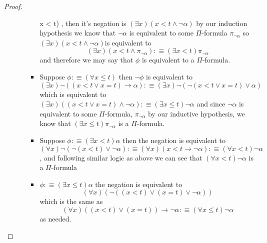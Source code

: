 \begin{proof}
\begin{itemize}
\begin{itemize}
\begin{itemize}
                \forall x < t\right) \alpha \), then it's negation is \(\left(
                \exists x\right) \left(x < t \land \neg \alpha\right) \) by
                our induction hypothesis we know that \(\neg \alpha \) is
                equivalent to some \(\Pi \)-formula \(\pi _{\neg \alpha} \) so \(
                \left(\exists x\right) \left(x < t \land \neg \alpha \right) \)is
                equivalent to 
                \[
                \left(\exists x\right) \left(x < t \land \pi
                _{\neg \alpha}\right) :\equiv \left(\exists x < t\right) \pi
                _{\neg \alpha} 
                \]
                and therefore we may say that \(\phi \) is
                equivalent to a \(\Pi \)-formula.
                \item Suppose \(\phi :\equiv \left(\forall x \le t\right) \)
                then \(\neg \phi \) is equivalent to 
                \[
                    \left(\exists x\right)
                    \neg \left(\left(x < t \lor x = t\right) \rightarrow \alpha
                    \right) :\equiv \left(\exists x\right) \neg \left(\neg
                    \left(x < t \lor x = t\right) \lor \alpha\right) 
                \]
                which
                is equivalent to \(\left(\exists x\right) \left(\left(x < t
                \lor x = t\right) \land \neg \alpha\right) :\equiv \left(
                \exists x \le t\right) \neg \alpha \) and since \(\neg
                \alpha \) is equivalent to some \(\Pi \)-formula, \(\pi _{\neg
                \alpha} \) by our inductive hypothesis, we know that \(\left(
                \exists x \le t\right) \pi _{\neg \alpha} \) is a \(\Pi
                \)-formula.
                \item Suppose \(\phi :\equiv \left(\exists x < t\right)
                \alpha \) then the negation is equivalent to \(\left(\forall x
                \right) \neg \left(\neg \left(x < t\right) \lor \neg \alpha
                \right) :\equiv \left(\forall x\right) \left(x < t
                \rightarrow \neg \alpha\right) :\equiv \left(\forall x < t
                \right) \neg \alpha \), and following similar logic as above
                we can see that \(\left(\forall x < t\right) \neg \alpha \) is
                a \(\Pi \)-formula
                \item \(\phi :\equiv \left(\exists x \le t\right) \alpha \)
                the negation is equivalent to 
                \[
                \left(\forall x\right) \left(
                \neg \left(\left(x < t\right) \lor \left(x = t\right) \lor
                \neg \alpha\right)\right) 
                \]
                which is the same as
                \[
                \left(\forall x\right)
                \left(\left(x < t\right) \lor \left(x = t\right)\right)
                \rightarrow \neg \alpha :\equiv \left(\forall x \le t\right)
                \neg \alpha 
                \] as needed.
            \end{itemize}
        \end{itemize}
    \end{itemize}
\end{proof}
